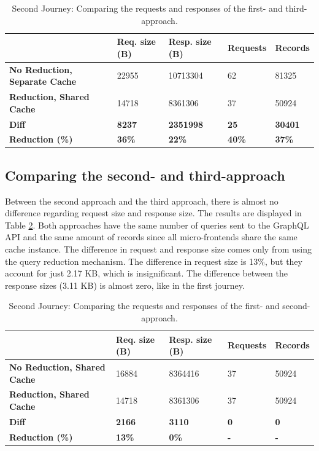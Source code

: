 \ifshowTables
\begin{table}[H]
  \begin{tabular}{|l|l|l|l|l|}
  \hline
  & \textbf{Req. size (B)} & \textbf{Resp. size (B)} & \textbf{Requests} & \textbf{Records} \\
  \hline
  \textbf{No Reduction, Separate Cache} & 22955 & 10713304 & 62 & 81325 \\
  \hline
  \textbf{Reduction, Shared Cache} & 14718 & 8361306 & 37 & 50924 \\
  \hline
  \hline
  \textbf{Diff} & \textbf{8237} & \textbf{2351998} & \textbf{25} & \textbf{30401} \\
  \hline
  \textbf{Reduction (\%)} & \textbf{36\%} & \textbf{22\%} & \textbf{40\%} & \textbf{37\%} \\
  \hline
  \end{tabular}
  \caption{Second Journey: Comparing the requests and responses of the first- and third-approach.}\label{table:results:size-comparison-second-path-no-cache-no-reduction-cache-reduction}
\end{table}
\fi

\subsection{Comparing the second- and third-approach}\label{subsection:results:comparison-second-path-first-third-approach}

Between the second approach and the third approach, there is almost no difference regarding request size and response size. The results are displayed in Table \ref{table:results:size-comparison-second-path-no-cache-no-reduction-cache-no-reduction}. Both approaches have the same number of queries sent to the GraphQL \ac{API} and the same amount of records since all micro-frontends share the same cache instance. The difference in request and response size comes only from using the query reduction mechanism. The difference in request size is 13\%, but they account for just 2.17 KB, which is insignificant. The difference between the response sizes (3.11 KB) is almost zero, like in the first journey.

\ifshowTables
\begin{table}[H]
\begin{tabular}{|l|l|l|l|l|}
  \hline
  & \textbf{Req. size (B)} & \textbf{Resp. size (B)} & \textbf{Requests} & \textbf{Records} \\
  \hline
  \textbf{No Reduction, Shared Cache} & 16884 & 8364416 & 37 & 50924 \\
  \hline
  \textbf{Reduction, Shared Cache} & 14718 & 8361306 & 37 & 50924 \\
  \hline
  \hline
  \textbf{Diff} & \textbf{2166} & \textbf{3110} & \textbf{0} & \textbf{0} \\
  \hline
  \textbf{Reduction (\%)} & \textbf{13\%} & \textbf{0\%} & \textbf{-} & \textbf{-} \\
  \hline
  \end{tabular}
  \caption{Second Journey: Comparing the requests and responses of the first- and second-approach.}\label{table:results:size-comparison-second-path-no-cache-no-reduction-cache-no-reduction}
\end{table}
\fi